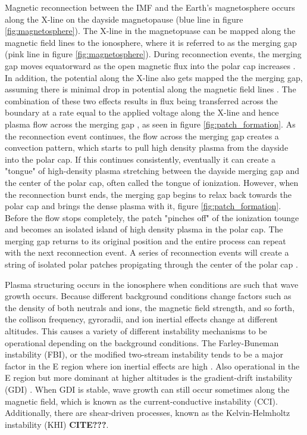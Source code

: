 Magnetic reconnection between the IMF and the Earth's magnetosphere occurs along the X-line on the dayside magnetopause (blue line in figure \ref{fig:magnetosphere}).  The X-line in the magnetopuase can be mapped along the magnetic field lines to the ionosphere, where it is referred to as the merging gap (pink line in figure \ref{fig:magnetosphere}).  During reconnection events, the merging gap moves equatorward as the open magnetic flux into the polar cap increases \citep{Lockwood1992a}.  In addition, the potential along the X-line also gets mapped the the merging gap, assuming there is minimal drop in potential along the magnetic field lines \citep{Lockwood1992b}.  The combination of these two effects results in flux being transferred across the boundary at a rate equal to the applied voltage  along the X-line and hence plasma flow across the merging gap \citep{Lockwood1992b}, as seen in figure \ref{fig:patch_formation}.  As the reconnection event continues, the flow across the merging gap creates a convection pattern, which starts to pull high density plasma from the dayside into the polar cap.  If this continues consistently, eventually it can create a "tongue" of high-density plasma stretching between the dayside merging gap and the center of the polar cap, often called the tongue of ionization.  However, when the reconnection burst ends, the merging gap begins to relax back towards the polar cap and brings the dense plasma with it, figure \ref{fig:patch_formation}.  Before the flow stops completely, the patch "pinches off" of the ionization tounge and becomes an isolated island of high density plasma in the polar cap.  The merging gap returns to its original position and the entire process can repeat with the next reconnection event.  A series of reconnection events will create a string of isolated polar patches propigating through the center of the polar cap \citep{Lockwook1992b}.

Plasma structuring occurs in the ionosphere when conditions are such that wave growth occurs.  Because different background conditions change factors such as the density of both neutrals and ions, the magnetic field strength, and so forth, the collison frequency, gyroradii, and ion inertial effects change at different altitudes.  This causes a variety of different instability mechanisms to be operational depending on the background conditions.  The Farley-Buneman instability (FBI), or the modified two-stream instability tends to be a major factor in the E region where ion inertial effects are high \citep{Farley1963,Buneman1963}.  Also operational in the E region but more dominant at higher altitudes is the gradient-drift instability (GDI) \citep{Simon1963,Hoh1963,Linson1970}.  When GDI is stable, wave growth can still occur sometimes along the magnetic field, which is known as the current-conductive instability (CCI).  Additionally, there are shear-driven processes, known as the Kelvin-Helmholtz instability (KHI) \textbf{CITE???}.

